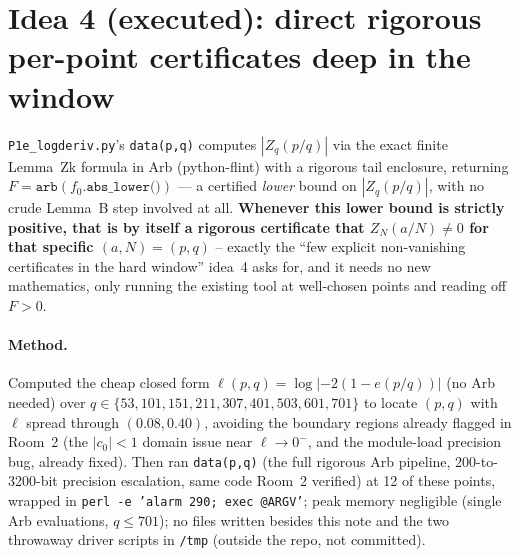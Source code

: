 \documentclass[11pt]{article}
\begin{document}
\section{Idea 4 (executed): direct rigorous per-point certificates deep in the window}
\texttt{P1e\_logderiv.py}'s \texttt{data(p,q)} computes $|Z_q(p/q)|$ via the exact finite Lemma~Zk
formula in Arb (python-flint) with a rigorous tail enclosure, returning $F=\texttt{arb}(f_0
\texttt{.abs\_lower()})$ --- a certified \emph{lower} bound on $|Z_q(p/q)|$, with no crude Lemma~B
step involved at all. \textbf{Whenever this lower bound is strictly positive, that is by itself a
rigorous certificate that $Z_N(a/N)\ne0$ for that specific $(a,N)=(p,q)$} -- exactly the ``few
explicit non-vanishing certificates in the hard window'' idea~4 asks for, and it needs no new
mathematics, only running the existing tool at well-chosen points and reading off $F>0$.

\paragraph{Method.} Computed the cheap closed form $\ell(p,q)=\log|{-2(1-e(p/q))}|$ (no Arb needed)
over $q\in\{53,101,151,211,307,401,503,601,701\}$ to locate $(p,q)$ with $\ell$ spread through
$(0.08,0.40)$, avoiding the boundary regions already flagged in Room~2 (the $|c_0|<1$ domain issue
near $\ell\to0^-$, and the module-load precision bug, already fixed). Then ran
\texttt{data(p,q)} (the full rigorous Arb pipeline, 200-to-3200-bit precision escalation, same
code Room~2 verified) at 12 of these points, wrapped in \texttt{perl -e 'alarm 290; exec @ARGV'};
peak memory negligible (single Arb evaluations, $q\le701$); no files written besides this note and
the two throwaway driver scripts in \texttt{/tmp} (outside the repo, not committed).
\end{document}
